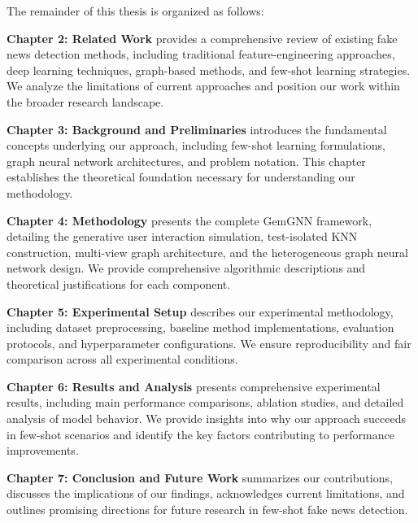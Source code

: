 The remainder of this thesis is organized as follows:

\textbf{Chapter 2: Related Work} provides a comprehensive review of existing fake news detection methods, including traditional feature-engineering approaches, deep learning techniques, graph-based methods, and few-shot learning strategies. We analyze the limitations of current approaches and position our work within the broader research landscape.

\textbf{Chapter 3: Background and Preliminaries} introduces the fundamental concepts underlying our approach, including few-shot learning formulations, graph neural network architectures, and problem notation. This chapter establishes the theoretical foundation necessary for understanding our methodology.

\textbf{Chapter 4: Methodology} presents the complete GemGNN framework, detailing the generative user interaction simulation, test-isolated KNN construction, multi-view graph architecture, and the heterogeneous graph neural network design. We provide comprehensive algorithmic descriptions and theoretical justifications for each component.

\textbf{Chapter 5: Experimental Setup} describes our experimental methodology, including dataset preprocessing, baseline method implementations, evaluation protocols, and hyperparameter configurations. We ensure reproducibility and fair comparison across all experimental conditions.

\textbf{Chapter 6: Results and Analysis} presents comprehensive experimental results, including main performance comparisons, ablation studies, and detailed analysis of model behavior. We provide insights into why our approach succeeds in few-shot scenarios and identify the key factors contributing to performance improvements.

\textbf{Chapter 7: Conclusion and Future Work} summarizes our contributions, discusses the implications of our findings, acknowledges current limitations, and outlines promising directions for future research in few-shot fake news detection.

\EndChapter
